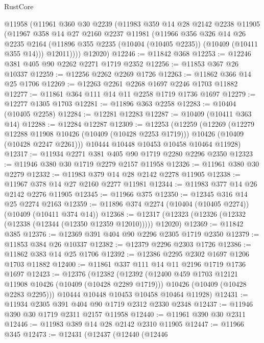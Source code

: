 \begin{lexlean}{RustCore}
\begin{coremodule}
      @11958
      (@11961
        @360
        @30
        @2239
        (@11983
          @359
          @14
          @28
          @2142
          @2238
          @11905
          (@11967
            @358
            @14
            @27
            @2160
            @2237
            @11981
            (@11966
              @356
              @326
              @14
              @26
              @2235
              @2164
              (@11896 @355 @2235 (@10404 (@10405 @2235)) (@10409 (@10411 @355 @14)))
              @12011))))
      @12020)
@12246 := @11842 @368
@12253 := @12246 @381 @405 @90 @2262 @2271 @1719 @2352
@12256 := @11853 @367 @26 @10337
@12259 := @12256 @2262 @2269 @1726
@12263 := @11862 @366 @14 @25 @1706
@12269 := @12263 @2261 @2268 @1697 @2246 @1703 @11882
@12277 := @11861 @364 @111 @14 @11 @2258 @1719 @1736 @1697
@12279 := @12277 @1305 @1703
@12281 := @11896 @363 @2258
@12283 := @10404 (@10405 @2258)
@12284 := @12281 @12283
@12287 := @10409 (@10411 @363 @14)
@12288 := @12284 @12287
@12309 := @12253
    (@12259
      (@12269
        (@12279 @12288 @11908 @10426 (@10409 (@10428 @2253 @1719)))
        @10426
        (@10409 (@10428 @2247 @2261)))
      @10444
      @10448
      @10453
      @10458
      @10464
      @11928)
@12317 := @11934 @2271 @381 @405 @90 @1719 @2280 @2296 @2350
@12323 := @11946 @380 @30 @1719 @2279 @2157 @11958
@12326 := @11961 @380 @30 @2279
@12332 := @11983 @379 @14 @28 @2142 @2278 @11905
@12338 := @11967 @378 @14 @27 @2160 @2277 @11981
@12344 := @11983 @377 @14 @26 @2142 @2276 @11905
@12345 := @11966 @375
@12350 := @12345 @316 @14 @25 @2274 @2163
@12359 := @11896 @374 @2274 (@10404 (@10405 @2274)) (@10409 (@10411 @374 @14))
@12368 := @12317 (@12323 (@12326 (@12332 (@12338 (@12344 (@12350 @12359 @12010))))) @12020)
@12369 := @11842 @385
@12376 := @12369 @391 @404 @90 @2296 @2305 @1719 @2350
@12379 := @11853 @384 @26 @10337
@12382 := @12379 @2296 @2303 @1726
@12386 := @11862 @383 @14 @25 @1706
@12392 := @12386 @2295 @2302 @1697 @1206 @1703 @11882
@12400 := @11861 @337 @111 @14 @11 @2196 @1719 @1736 @1697
@12423 := @12376
    (@12382
      (@12392
        (@12400 @459 @1703 @12121 @11908 @10426 (@10409 (@10428 @2289 @1719)))
        @10426
        (@10409 (@10428 @2283 @2295)))
      @10444
      @10448
      @10453
      @10458
      @10464
      @11928)
@12431 := @11934 @2305 @391 @404 @90 @1719 @2312 @2330 @2348
@12437 := @11946 @390 @30 @1719 @2311 @2157 @11958
@12440 := @11961 @390 @30 @2311
@12446 := @11983 @389 @14 @28 @2142 @2310 @11905
@12447 := @11966 @345
@12473 := @12431
    (@12437
      (@12440
        (@12446

\end{coremodule}
\end{lexlean}
